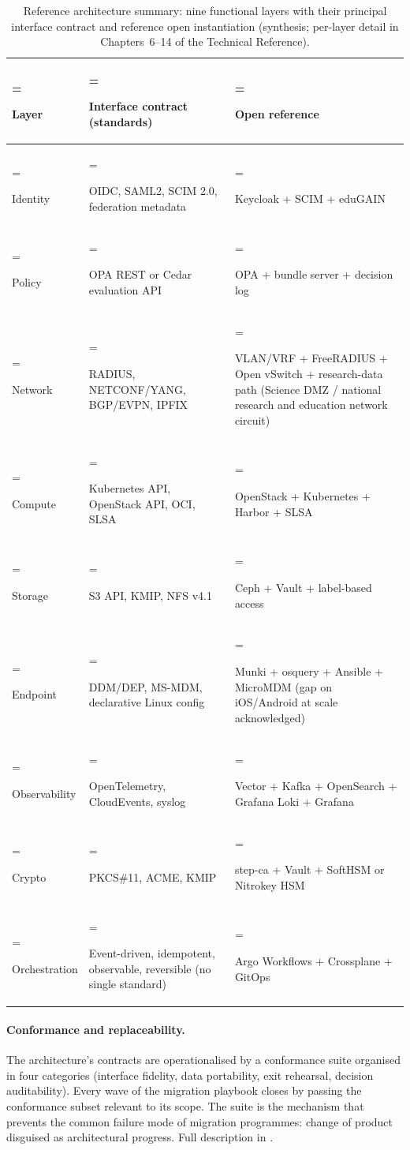 \begin{table}[H]
\centering\small
\caption{Reference architecture summary: nine functional layers
with their principal interface contract and reference open
instantiation (synthesis; per-layer detail in
Chapters~6--14 of the Technical Reference).}
\label{tab:synth-architecture}
\begin{tabularx}{\textwidth}{%
  >{\hsize=0.45\hsize\linewidth=\hsize\bfseries\raggedright\arraybackslash}X%
  >{\hsize=0.95\hsize\linewidth=\hsize\raggedright\arraybackslash}X%
  >{\hsize=1.60\hsize\linewidth=\hsize\raggedright\arraybackslash}X%
}
\toprule
Layer & Interface contract (standards) & Open reference \\
\midrule
Identity        & OIDC, SAML2, SCIM 2.0, federation metadata  & Keycloak + SCIM + eduGAIN \\
Policy          & OPA REST or Cedar evaluation API            & OPA + bundle server + decision log \\
Network         & RADIUS, NETCONF/YANG, BGP/EVPN, IPFIX       & VLAN/VRF + FreeRADIUS + Open vSwitch + research-data path (Science DMZ / national research and education network circuit) \\
Compute         & Kubernetes API, OpenStack API, OCI, SLSA    & OpenStack + Kubernetes + Harbor + SLSA \\
Storage         & S3 API, KMIP, NFS v4.1                      & Ceph + Vault + label-based access \\
Endpoint        & DDM/DEP, MS-MDM, declarative Linux config   & Munki + osquery + Ansible + MicroMDM (gap on iOS/Android at scale acknowledged) \\
Observability   & OpenTelemetry, CloudEvents, syslog          & Vector + Kafka + OpenSearch + Grafana Loki + Grafana \\
Crypto          & PKCS\#11, ACME, KMIP                        & step-ca + Vault + SoftHSM or Nitrokey HSM \\
Orchestration   & Event-driven, idempotent, observable, reversible (no single standard) & Argo Workflows + Crossplane + GitOps \\
\bottomrule
\end{tabularx}
\end{table}

\paragraph{Conformance and replaceability.} The architecture's
contracts are operationalised by a conformance suite
organised in four categories (interface
fidelity, data portability, exit rehearsal, decision auditability).
Every wave of the migration playbook closes by passing the
conformance subset relevant to its scope. The suite is the
mechanism that prevents the common failure mode of migration
programmes: change of product disguised as architectural progress.
Full description in .

